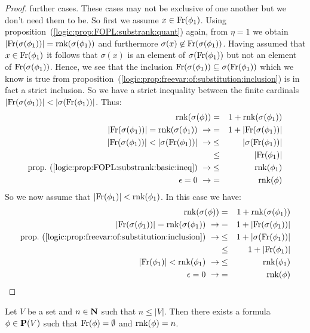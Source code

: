 \begin{proof}
further cases. These cases may not be exclusive of one another but
we don't need them to be. So first we assume $x\in\mbox{\rm Fr}(\phi_{1})$.
Using proposition~(\ref{logic:prop:FOPL:substrank:quant}) again,
from $\eta=1$ we obtain
$|\mbox{\rm Fr}(\sigma(\phi_{1}))|=\mbox{\rm rnk}(\sigma(\phi_{1}))$ and furthermore
$\sigma(x)\not\in\mbox{\rm Fr}(\sigma(\phi_{1}))$. Having assumed that
$x\in\mbox{\rm Fr}(\phi_{1})$ it follows that $\sigma(x)$ is an element of
$\sigma(\mbox{\rm Fr}(\phi_{1}))$ but not an element of
$\mbox{\rm Fr}(\sigma(\phi_{1}))$. Hence, we see that the inclusion
$\mbox{\rm Fr}(\sigma(\phi_{1}))\subseteq\sigma(\mbox{\rm Fr}(\phi_{1}))$ which we
know is true from
proposition~(\ref{logic:prop:freevar:of:substitution:inclusion}) is
in fact a strict inclusion. So we have a strict inequality between
the finite cardinals
$|\free(\sigma(\phi_{1}))|<|\sigma(\free(\phi_{1}))|$. Thus:
    \begin{eqnarray*}
    \rnk(\sigma(\phi))&=&1+\rnk(\sigma(\phi_{1}))\\
    |\free(\sigma(\phi_{1}))|=\rnk(\sigma(\phi_{1}))\ \rightarrow
    &=&1+|\free(\sigma(\phi_{1}))|\\
    |\free(\sigma(\phi_{1}))|<|\sigma(\free(\phi_{1}))|\ \rightarrow
    &\leq&|\sigma(\free(\phi_{1}))|\\
    &\leq&|\free(\phi_{1})|\\
    \mbox{prop.~(\ref{logic:prop:FOPL:substrank:basic:ineq})}\ \rightarrow
    &\leq&\rnk(\phi_{1})\\
    \epsilon=0\ \rightarrow&=&\rnk(\phi)
    \end{eqnarray*}
So we now assume that $|\mbox{\rm Fr}(\phi_{1})|<\mbox{\rm rnk}(\phi_{1})$. In this
case we have:
    \begin{eqnarray*}
    \rnk(\sigma(\phi))&=&1+\rnk(\sigma(\phi_{1}))\\
    |\free(\sigma(\phi_{1}))|=\rnk(\sigma(\phi_{1}))\ \rightarrow
    &=&1+|\free(\sigma(\phi_{1}))|\\
    \mbox{prop.~(\ref{logic:prop:freevar:of:substitution:inclusion})}\ \rightarrow
    &\leq&1+|\sigma(\free(\phi_{1}))|\\
    &\leq&1+|\free(\phi_{1})|\\
    |\free(\phi_{1})|<\rnk(\phi_{1})\ \rightarrow
    &\leq&\rnk(\phi_{1})\\
    \epsilon=0\ \rightarrow&=&\rnk(\phi)
    \end{eqnarray*}
\end{proof}
\begin{prop}\label{logic:prop:FOPL:substrank:closed:fullrank}
Let $V$ be a set and $n\in\mbox{$\bf N$}$ such that $n\leq|V|$. Then there
exists a formula $\phi\in\mbox{${\bf P}(V)$}$ such that $\mbox{\rm Fr}(\phi)=\emptyset$ and
$\mbox{\rm rnk}(\phi)=n$.
\end{prop}
